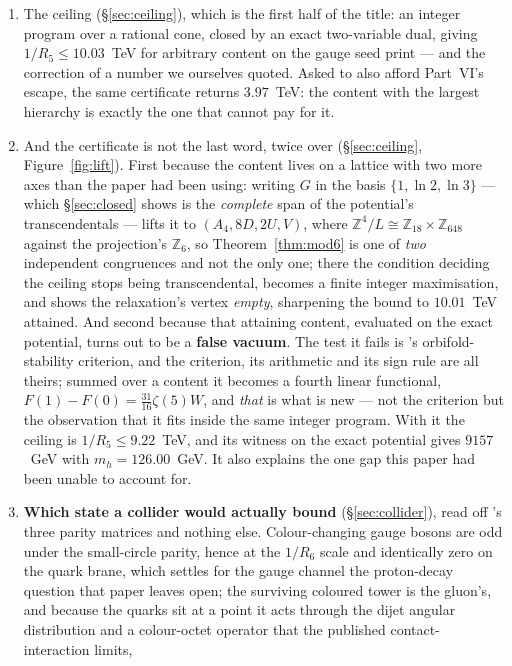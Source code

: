 \documentclass[11pt,a4paper]{article}
\newcommand{\ZZ}{\mathbb{Z}}
\begin{document}
\begin{enumerate}
candidate seed that same vanishing makes the fourth moment the one \emph{odd} rung of the three.
\item The ceiling (\S\ref{sec:ceiling}), which is the first half of the title: an integer program over a rational
cone, closed by an exact two-variable dual, giving $1/R_5\le 10.03$~TeV for arbitrary content on the gauge seed \cite{KM25} print ---
and the correction of a number we ourselves quoted. Asked to also afford Part~VI's escape, the same
certificate returns $3.97$~TeV: the content with the largest hierarchy is exactly the one that
cannot pay for it.
\item And the certificate is not the last word, twice over (\S\ref{sec:ceiling},
Figure~\ref{fig:lift}). First because the content lives on a lattice with two more axes than the
paper had been using: writing $G$ in the basis $\{1,\ln2,\ln3\}$ --- which \S\ref{sec:closed} shows
is the \emph{complete} span of the potential's transcendentals --- lifts it to $(A_4,8D,2U,V)$,
where $\ZZ^4/L\cong\ZZ_{18}\times\ZZ_{648}$ against the projection's $\ZZ_6$, so
Theorem~\ref{thm:mod6} is one of \emph{two} independent congruences and not the only one; there the
condition deciding the ceiling stops being transcendental, becomes a
finite integer maximisation, and shows the relaxation's vertex \emph{empty}, sharpening the bound
to $10.01$~TeV attained. And second because that attaining content, evaluated on the exact
potential, turns out to be a \textbf{false vacuum}. The test it fails is \cite{CCD24}'s
orbifold-stability criterion, and the criterion, its arithmetic and its sign rule are all theirs;
summed over a content it becomes a fourth linear functional,
$F(1)-F(0)=\tfrac{31}{16}\zeta(5)W$, and \emph{that} is what is new --- not the criterion but the
observation that it fits inside the same integer program. With it the ceiling is
$1/R_5\le9.22$~TeV, and its witness on the exact potential gives $9157$~GeV with
$m_h=126.00$~GeV. It also explains the one gap this paper had been unable to account for.
\item \textbf{Which state a collider would actually bound} (\S\ref{sec:collider}), read off
\cite{KM25}'s three parity matrices and nothing else. Colour-changing gauge bosons are odd under the
small-circle parity, hence at the $1/R_6$ scale and identically zero on the quark brane, which
settles for the gauge channel the proton-decay question that paper leaves open; the surviving
coloured tower is the gluon's, and because the quarks sit at a point it acts through the dijet
angular distribution and a colour-octet operator that the published contact-interaction limits,

\end{enumerate}
\end{document}
